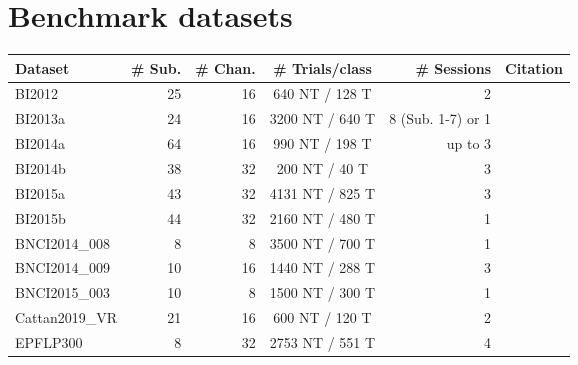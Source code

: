 \documentclass[twocolumn]{article}
\begin{document}
\section{Benchmark datasets}
\begin{table*}[h]
\begin{tabularx}{\linewidth}{@{}Xrrcrl@{}}
		\toprule
		Dataset        & \# Sub.               & \# Chan. & \# Trials/class              & \# Sessions & Citation                   \\ \midrule
		BI2012         & 25                         & 16          & 640 NT / 128 T           & 2                          &                                          \\
		BI2013a        & 24                         & 16          & 3200 NT / 640 T
                   & 8 (Sub. 1-7) or 1  &                                          \\
		BI2014a        & 64                         & 16          & 990 NT / 198 T           & up to 3                    &                                          \\
		BI2014b        & 38                         & 32          & 200 NT / 40 T            & 3                          &                                          \\
		BI2015a        & 43                         & 32          & 4131 NT / 825 T          & 3                          &                                          \\
		BI2015b        & 44                         & 32          & 2160 NT / 480 T          & 1                          &                                          \\
		BNCI2014\_008  & 8                          & 8           & 3500 NT / 700 T          & 1                          &                                         \\
		BNCI2014\_009  & 10                         & 16          & 1440 NT / 288 T          & 3                          &                                         \\
		BNCI2015\_003  & 10                         & 8           & 1500 NT / 300 T          & 1                          &                                          \\
		Cattan2019\_VR & 21                         & 16          & 600 NT / 120 T           & 2                          &                                          \\
		EPFLP300       & 8                          & 32          & 2753 NT / 551 T          & 4                          &                                          \\

\end{tabularx}
\end{table*}
\end{document}
